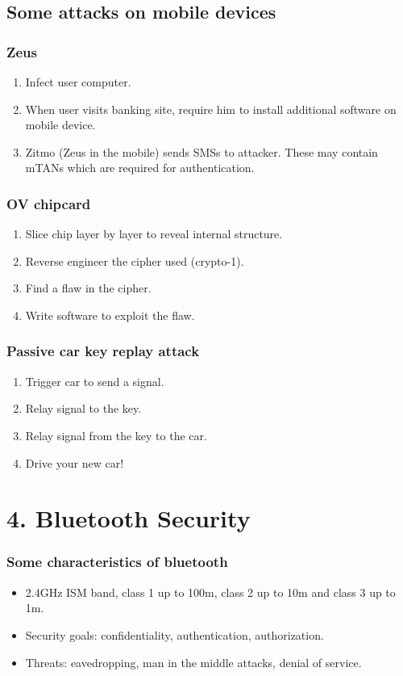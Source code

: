 \documentclass{article}
\begin{document}
\subsection*{Some attacks on mobile devices}

\subsubsection*{Zeus}
\begin{enumerate}
\item Infect user computer.
\item When user visits banking site, require him to install additional software on mobile device.
\item Zitmo (Zeus in the mobile) sends SMSs to attacker. These may contain mTANs which are required for authentication.
\end{enumerate}
    
\subsubsection*{OV chipcard}
\begin{enumerate}
\item Slice chip layer by layer to reveal internal structure.
\item Reverse engineer the cipher used (crypto-1).
\item Find a flaw in the cipher.
\item Write software to exploit the flaw.
\end{enumerate}
    
\subsubsection*{Passive car key replay attack~\cite{francillon2011relay}}
\begin{enumerate}
\item Trigger car to send a signal.
\item Relay signal to the key.
\item Relay signal from the key to the car.
\item Drive your new car!
\end{enumerate}

\newpage
\section*{4. Bluetooth Security}

\subsubsection*{Some characteristics of bluetooth}
\begin{itemize}
\item 2.4GHz ISM band, class 1 up to 100m, class 2 up to 10m and class 3 up to 1m.
\item Security goals: confidentiality, authentication, authorization.
\item Threats: eavedropping, man in the middle attacks, denial of service.
\end{itemize}
\end{document}
